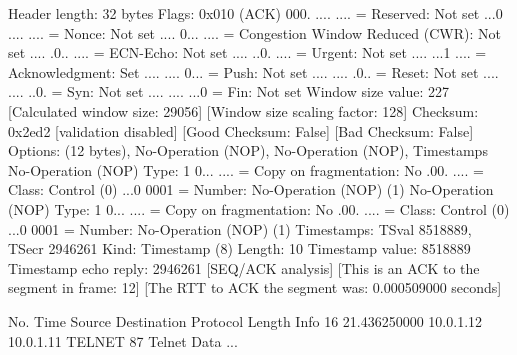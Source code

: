     Header length: 32 bytes
    Flags: 0x010 (ACK)
        000. .... .... = Reserved: Not set
        ...0 .... .... = Nonce: Not set
        .... 0... .... = Congestion Window Reduced (CWR): Not set
        .... .0.. .... = ECN-Echo: Not set
        .... ..0. .... = Urgent: Not set
        .... ...1 .... = Acknowledgment: Set
        .... .... 0... = Push: Not set
        .... .... .0.. = Reset: Not set
        .... .... ..0. = Syn: Not set
        .... .... ...0 = Fin: Not set
    Window size value: 227
    [Calculated window size: 29056]
    [Window size scaling factor: 128]
    Checksum: 0x2ed2 [validation disabled]
        [Good Checksum: False]
        [Bad Checksum: False]
    Options: (12 bytes), No-Operation (NOP), No-Operation (NOP), Timestamps
        No-Operation (NOP)
            Type: 1
                0... .... = Copy on fragmentation: No
                .00. .... = Class: Control (0)
                ...0 0001 = Number: No-Operation (NOP) (1)
        No-Operation (NOP)
            Type: 1
                0... .... = Copy on fragmentation: No
                .00. .... = Class: Control (0)
                ...0 0001 = Number: No-Operation (NOP) (1)
        Timestamps: TSval 8518889, TSecr 2946261
            Kind: Timestamp (8)
            Length: 10
            Timestamp value: 8518889
            Timestamp echo reply: 2946261
    [SEQ/ACK analysis]
        [This is an ACK to the segment in frame: 12]
        [The RTT to ACK the segment was: 0.000509000 seconds]

No.     Time           Source                Destination           Protocol Length Info
     16 21.436250000   10.0.1.12             10.0.1.11             TELNET   87     Telnet Data ...


